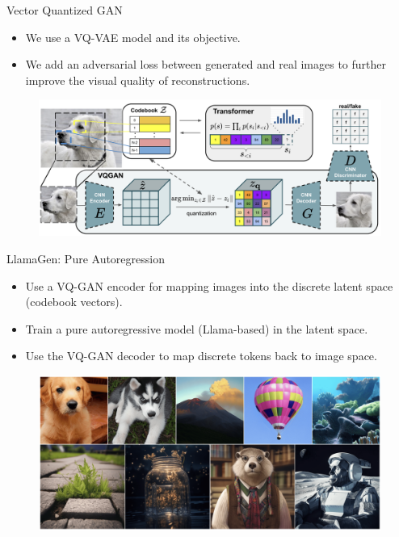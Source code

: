 \documentclass{beamer}
\begin{document}
\begin{frame}{Vector Quantized GAN}
	\begin{itemize}
		\item We use a VQ-VAE model and its objective.
		\item We add an adversarial loss between generated and real images to further improve the visual quality of reconstructions.
	\end{itemize}
	\begin{figure}
		\includegraphics[width=\linewidth]{figs/vqgan}
	\end{figure}
\end{frame}
\begin{frame}{LlamaGen: Pure Autoregression}
	\begin{itemize}
		\item Use a VQ-GAN encoder for mapping images into the discrete latent space (codebook vectors).
		\item Train a pure autoregressive model (Llama-based) in the latent space.
		\item Use the VQ-GAN decoder to map discrete tokens back to image space.
	\end{itemize}
	\vspace{-0.3cm}
	\begin{figure}
		\includegraphics[width=0.85\linewidth]{figs/llamagen_samples}
	\end{figure}
\end{frame}
\end{document}
